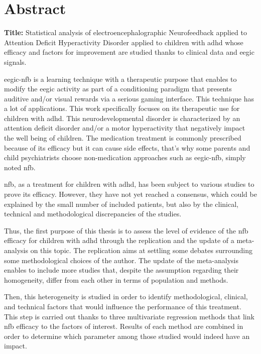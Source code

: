 
\chapter*{Abstract}

\noindent \large{\textbf{Title:}} Statistical analysis of electroencephalographic Neurofeedback applied to Attention Deficit Hyperactivity Disorder
\vskip 0.3in
 applied to children with \gls{adhd} whose efficacy and factors for 
improvement are studied thanks to clinical data and \gls{eegic} signals.

\gls{eegic}-\gls{nfb} is a learning technique with a therapeutic purpose that enables to modify the \gls{eegic} activity 
as part of a conditioning paradigm that presents auditive and/or visual rewards via a serious gaming interface.
This technique has a lot of applications. This work specifically focuses on its therapeutic use for children with \gls{adhd}.
This neurodevelopmental disorder is characterized by an attention deficit disorder and/or a motor hyperactivity that
negatively impact the well being of children. The medication treatment is commonly prescribed because of its efficacy but
it can cause side effects, that's why some parents and child psychiatrists choose non-medication approaches such as \gls{eegic}-\gls{nfb}, simply noted 
\gls{nfb}. 

\gls{nfb}, as a treatment for children with \gls{adhd}, has been subject to various studies to prove its efficacy. 
However, they have not yet reached a consensus, which could be explained by the small number of included patients, but also by
the clinical, technical and methodological discrepancies of the studies.  

Thus, the first purpose of this thesis is to assess the level of evidence of the \gls{nfb} efficacy for children with \gls{adhd}
through the replication and the update of a meta-analysis on this topic. 
The replication aims at settling some debates surrounding some methodological choices of the author. 
The update of the meta-analysis enables to include more studies that, despite the assumption regarding their homogeneity, 
differ from each other in terms of population and methods.

Then, this heterogeneity is studied in order to identify methodological, clinical, and technical factors that would influence
the performance of this treatment. This step is carried out thanks to three multivariate regression methods that link \gls{nfb} 
efficacy to the factors of interest. Results of each method are combined in order to determine which parameter among those
studied would indeed have an impact. 

